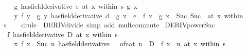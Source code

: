 \begin{isabellebody}
\ \ \ \ {\isacharparenleft}{\kern0pt}g\ has{\isacharunderscore}{\kern0pt}field{\isacharunderscore}{\kern0pt}derivative\ e{\isacharparenright}{\kern0pt}\ {\isacharparenleft}{\kern0pt}at\ x\ within\ s{\isacharparenright}{\kern0pt}{\isasymLongrightarrow}\ g\ x\ {\isasymnoteq}\ {}\ {\isasymLongrightarrow}\isanewline
\ \ \ \ {\isacharparenleft}{\kern0pt}{\isacharparenleft}{\kern0pt}{\isasymlambda}y{\isachardot}{\kern0pt}\ f\ y\ {\isacharslash}{\kern0pt}\ g\ y{\isacharparenright}{\kern0pt}\ has{\isacharunderscore}{\kern0pt}field{\isacharunderscore}{\kern0pt}derivative\ {\isacharparenleft}{\kern0pt}d\ {\isacharasterisk}{\kern0pt}\ g\ x\ {\isacharminus}{\kern0pt}\ {\isacharparenleft}{\kern0pt}e\ {\isacharasterisk}{\kern0pt}\ f\ x{\isacharparenright}{\kern0pt}{\isacharparenright}{\kern0pt}\ {\isacharslash}{\kern0pt}\ {\isacharparenleft}{\kern0pt}g\ x\ {\isacharcircum}{\kern0pt}\ Suc\ {\isacharparenleft}{\kern0pt}Suc\ {}{\isacharparenright}{\kern0pt}{\isacharparenright}{\kern0pt}{\isacharparenright}{\kern0pt}\ {\isacharparenleft}{\kern0pt}at\ x\ within\ s{\isacharparenright}{\kern0pt}{\isachardoublequoteclose}\isanewline
%
\isadelimproof
\ \ %
\endisadelimproof
%
\isatagproof
{}\isamarkupfalse%
\ {\isacharparenleft}{\kern0pt}drule\ {\isacharparenleft}{\kern0pt}{}{\isacharparenright}{\kern0pt}\ DERIV{\isacharunderscore}{\kern0pt}divide{\isacharparenright}{\kern0pt}\ {\isacharparenleft}{\kern0pt}simp\ add{\isacharcolon}{\kern0pt}\ mult{\isachardot}{\kern0pt}commute{\isacharparenright}{\kern0pt}%
\endisatagproof
{\isafoldproof}%
%
\isadelimproof
\isanewline
%
\endisadelimproof
\isanewline
{}\isamarkupfalse%
\ DERIV{\isacharunderscore}{\kern0pt}power{\isacharunderscore}{\kern0pt}Suc{\isacharcolon}{\kern0pt}\isanewline
\ \ {\isachardoublequoteopen}{\isacharparenleft}{\kern0pt}f\ has{\isacharunderscore}{\kern0pt}field{\isacharunderscore}{\kern0pt}derivative\ D{\isacharparenright}{\kern0pt}\ {\isacharparenleft}{\kern0pt}at\ x\ within\ s{\isacharparenright}{\kern0pt}\ {\isasymLongrightarrow}\isanewline
\ \ \ \ {\isacharparenleft}{\kern0pt}{\isacharparenleft}{\kern0pt}{\isasymlambda}x{\isachardot}{\kern0pt}\ f\ x\ {\isacharcircum}{\kern0pt}\ Suc\ n{\isacharparenright}{\kern0pt}\ has{\isacharunderscore}{\kern0pt}field{\isacharunderscore}{\kern0pt}derivative\ {\isacharparenleft}{\kern0pt}{}\ {\isacharplus}{\kern0pt}\ of{\isacharunderscore}{\kern0pt}nat\ n{\isacharparenright}{\kern0pt}\ {\isacharasterisk}{\kern0pt}\ {\isacharparenleft}{\kern0pt}D\ {\isacharasterisk}{\kern0pt}\ f\ x\ {\isacharcircum}{\kern0pt}\ n{\isacharparenright}{\kern0pt}{\isacharparenright}{\kern0pt}\ {\isacharparenleft}{\kern0pt}at\ x\ within\ s{\isacharparenright}{\kern0pt}{\isachardoublequoteclose}\isanewline

\end{isabellebody}
